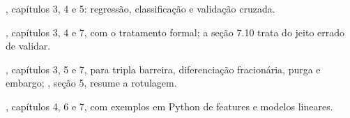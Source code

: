 \enlargethispage{4\baselineskip}
\begin{leituras}
  \item \citet{james2021}, capítulos 3, 4 e 5: regressão, classificação e validação cruzada.
  \item \citet{hastie2009}, capítulos 3, 4 e 7, com o tratamento formal; a seção 7.10 trata do jeito errado de validar.
  \item \citet{lopezdeprado2018}, capítulos 3, 5 e 7, para tripla barreira, diferenciação fracionária, purga e embargo; \citet{lopezdeprado2020}, seção 5, resume a rotulagem.
  \item \citet{jansen2020}, capítulos 4, 6 e 7, com exemplos em Python de features e modelos lineares.
\end{leituras}
